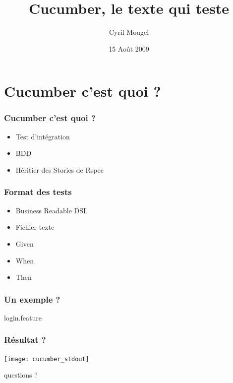 \documentclass{beamer}
\title{Cucumber, le texte qui teste}
\author{Cyril Mougel}
\date{15 Août 2009}
\begin{document}
\begin{frame}
    \titlepage
\end{frame}

\section{Cucumber c'est quoi ?}

\begin{frame}
	\frametitle{Cucumber c'est quoi ?}
	\begin{itemize}
    \item Test d'intégration
    \item BDD
    \item Héritier des Stories de Rspec
	\end{itemize}
\end{frame}

\begin{frame}
    \frametitle{Format des tests}
    \begin{itemize}
        \item Business Readable DSL
        \item Fichier texte
        \item Given
        \item When
        \item Then
    \end{itemize}
\end{frame}

\begin{frame}
  \frametitle{Un exemple ?}
  \begin{beamerboxesrounded}{login.feature}
    
  \end{beamerboxesrounded}
\end{frame}

\begin{frame}
  \frametitle{Résultat ?}
  \begin{center}
    \texttt{[image: cucumber\_stdout]}
  \end{center}
\end{frame}

\begin{frame}
    \begin{center}
    \huge{}
    questions ?
    \end{center}
\end{frame}
\end{document}
